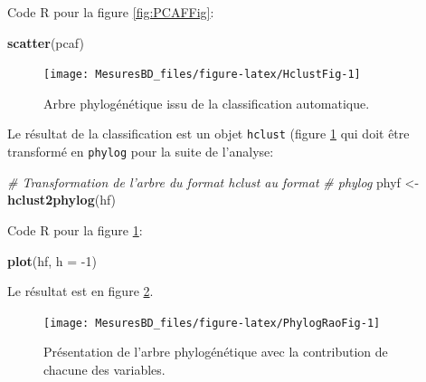\documentclass[
  11pt,
  french,
  a4paper,
  extrafontsizes,onecolumn,openright
  ]{memoir}
\newenvironment{Shaded}{\begin{snugshade}}{\end{snugshade}}
\newcommand{\CommentTok}[1]{\textcolor[rgb]{0.56,0.35,0.01}{\textit{#1}}}
\newcommand{\DataTypeTok}[1]{\textcolor[rgb]{0.13,0.29,0.53}{#1}}
\newcommand{\DecValTok}[1]{\textcolor[rgb]{0.00,0.00,0.81}{#1}}
\newcommand{\KeywordTok}[1]{\textcolor[rgb]{0.13,0.29,0.53}{\textbf{#1}}}
\newcommand{\NormalTok}[1]{#1}
\newcommand{\StringTok}[1]{\textcolor[rgb]{0.31,0.60,0.02}{#1}}
\begin{document}
\normalsize

Code R pour la figure \ref{fig:PCAFFig}:

\scriptsize

\begin{Shaded}
\begin{Highlighting}[]
\KeywordTok{scatter}\NormalTok{(pcaf)}
\end{Highlighting}
\end{Shaded}

\normalsize

\scriptsize

\begin{figure}

{\centering \texttt{[image: MesuresBD\_files/figure-latex/HclustFig-1]} 

}

\caption{Arbre phylogénétique issu de la classification automatique.}\label{fig:HclustFig}
\end{figure}

\normalsize

Le résultat de la classification est un objet \texttt{hclust} (figure \ref{fig:HclustFig} qui doit être transformé en \texttt{phylog} pour la suite de l'analyse:

\scriptsize

\begin{Shaded}
\begin{Highlighting}[]
\CommentTok{# Transformation de l'arbre du format hclust au format}
\CommentTok{# phylog}
\NormalTok{phyf <-}\StringTok{ }\KeywordTok{hclust2phylog}\NormalTok{(hf)}
\end{Highlighting}
\end{Shaded}

\normalsize

Code R pour la figure \ref{fig:HclustFig}:

\scriptsize

\begin{Shaded}
\begin{Highlighting}[]
\KeywordTok{plot}\NormalTok{(hf, }\DataTypeTok{h =} \DecValTok{-1}\NormalTok{)}
\end{Highlighting}
\end{Shaded}

\normalsize

Le résultat est en figure \ref{fig:PhylogRaoFig}.



\scriptsize

\begin{figure}

{\centering \texttt{[image: MesuresBD\_files/figure-latex/PhylogRaoFig-1]} 

}

\caption{Présentation de l'arbre phylogénétique avec la contribution de chacune des variables.}\label{fig:PhylogRaoFig}
\end{figure}
\end{document}
